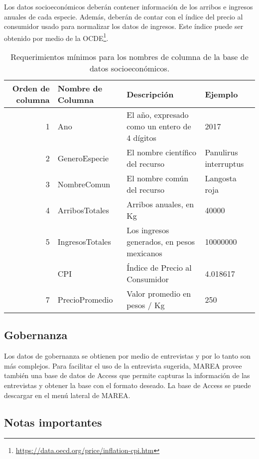\documentclass[]{krantz}
\renewcommand{\href}[2]{#2\footnote{\url{#1}}}
\begin{document}
Los datos socioeconómicos deberán contener información de los arribos e
ingresos anuales de cada especie. Además, deberán de contar con el
índice del precio al consumidor usado para normalizar los datos de
ingresos. Este índice puede ser obtenido por medio de la
\href{https://data.oecd.org/price/inflation-cpi.htm}{OCDE}.

\begin{table}

\caption{\label{tab:formato-soc}Requerimientos mínimos para los nombres de columna de la base de datos socioeconómicos.}
\centering
\begin{tabular}[t]{rlll}
\toprule
Orden de columna & Nombre de Columna & Descripción & Ejemplo\\
\midrule
1 & Ano & El año, expresado como un entero de 4 dígitos & 2017\\
2 & GeneroEspecie & El nombre científico del recurso & Panulirus interruptus\\
3 & NombreComun & El nombre común del recurso & Langosta roja\\
4 & ArribosTotales & Arribos anuales, en Kg & 40000\\
5 & IngresosTotales & Los ingresos generados, en pesos mexicanos & 10000000\\
\addlinespace
6 & CPI & Índice de Precio al Consumidor & 4.018617\\
7 & PrecioPromedio & Valor promedio en pesos / Kg & 250\\
\bottomrule
\end{tabular}
\end{table}

\hypertarget{gobernanza}{%
\subsection{Gobernanza}\label{gobernanza}}

Los datos de gobernanza se obtienen por medio de entrevistas y por lo
tanto son más complejos. Para facilitar el uso de la entrevista
sugerida, MAREA provee también una base de datos de Access que permite
capturas la información de las entrevistas y obtener la base con el
formato deseado. La base de Access se puede descargar en el menú lateral
de MAREA.

\hypertarget{notas-importantes}{%
\subsection{Notas importantes}\label{notas-importantes}}
\end{document}
